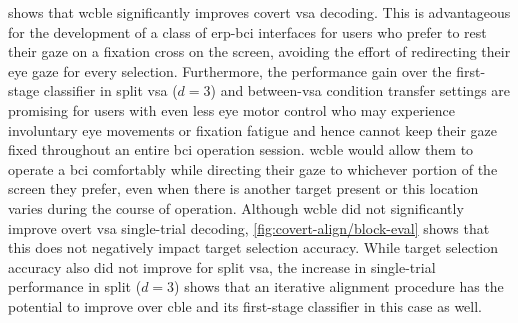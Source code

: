  shows that \ac{wcble} significantly improves
covert \ac{vsa} decoding.
This is advantageous for the development of a class of \ac{erp}-\ac{bci} interfaces for
users who prefer to rest their gaze on a fixation cross on the screen,
avoiding the effort of redirecting their eye gaze for every selection.
Furthermore, the performance gain over the first-stage classifier in split
\ac{vsa} ($d=3$) and between-\ac{vsa} condition transfer settings are promising for
users with even less eye motor control who may experience involuntary eye
movements or fixation fatigue and hence cannot keep their gaze fixed throughout an
entire \ac{bci} operation session.
\ac{wcble} would allow them to operate a \ac{bci} comfortably while directing
their gaze to whichever portion of the screen they prefer, even when there is
another target present or this location varies during the
course of operation.
Although \ac{wcble} did not significantly improve overt \ac{vsa} single-trial decoding,
\cref{fig:covert-align/block-eval} shows that this does not negatively impact target
selection accuracy.
While target selection accuracy also did not improve for split \ac{vsa}, the
increase in single-trial performance in split ($d=3$) shows that an iterative
alignment procedure has the potential to improve over \ac{cble} and its first-stage
classifier in this case as well.


